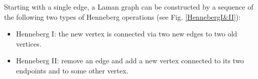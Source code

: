 \documentclass[11pt]{amsart}
\theoremstyle{definition}
\theoremstyle{remark}
\numberwithin{equation}{section}
\begin{document}
Starting with a single edge, a Laman graph can be constructed by a sequence of the following two types of  Henneberg operations (see Fig. \ref{HennebergI&II}):

\begin{itemize}
  \item Henneberg I: the new vertex is connected via two new edges to two old vertices.
  \item Henneberg II: remove an edge and add a new vertex connected to its two endpoints and to some other vertex.
\end{itemize}
\begin{figure}[htp]
  \centering



\begin{tikzpicture}[x=0.75pt,y=0.75pt,yscale=-1,xscale=1]


\end{tikzpicture}
\end{figure}
\end{document}
